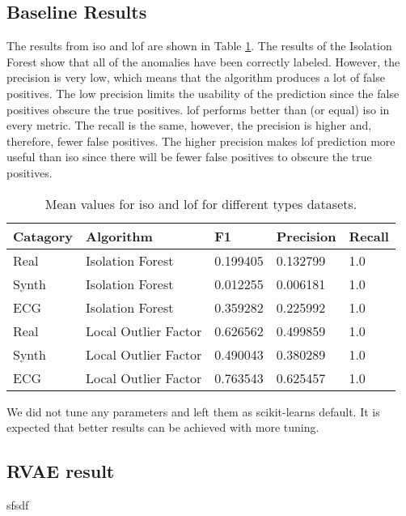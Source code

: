 \subsection{Baseline Results}
The results from \gls{iso} and \gls{lof} are shown in Table \ref{tab:baseline}. The results of the Isolation Forest show that all of the anomalies have been correctly labeled. However, the precision is very low, which means that the algorithm produces a lot of false positives. The low precision limits the usability of the prediction since the false positives obscure the true positives. \Gls{lof} performs better than (or equal) \gls{iso} in every metric. The recall is the same, however, the precision is higher and, therefore, fewer false positives. The higher precision makes \gls{lof} prediction more useful than \gls{iso} since there will be fewer false positives to obscure the true positives.

\begin{table}[htbp]
    \centering
    \begin{tabular}{|l|l|l|l|l|}
        \hline
        Catagory & Algorithm            & F1       & Precision & Recall \\ \hline
        Real     & Isolation Forest     & 0.199405 & 0.132799  & 1.0    \\ \hline
        Synth    & Isolation Forest     & 0.012255 & 0.006181  & 1.0    \\ \hline
        ECG      & Isolation Forest     & 0.359282 & 0.225992  & 1.0    \\ \hline
        Real     & Local Outlier Factor & 0.626562 & 0.499859  & 1.0    \\ \hline
        Synth    & Local Outlier Factor & 0.490043 & 0.380289  & 1.0    \\ \hline
        ECG      & Local Outlier Factor & 0.763543 & 0.625457  & 1.0    \\ \hline
    \end{tabular}
    \caption{Mean values for \gls{iso} and \gls{lof} for different types datasets.}\label{tab:baseline}
\end{table}

\noindent
We did not tune any parameters and left them as \glspl{scikit-learn} default. It is expected that better results can be achieved with more tuning. 


\subsection{RVAE result}
sfsdf